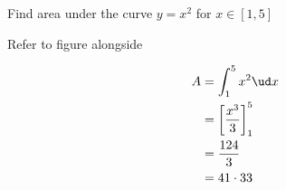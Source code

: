\question[4] Find area under the curve $y=x^2$ for $x\in [1,5]$

\ifprintanswers
  \begin{marginfigure}
  \end{marginfigure}
\fi

\begin{solution}[\halfpage]
  Refer to figure alongside

  \begin{align}
     A &= \int_1^5 x^2\ud x \\
	   &= \left[ \dfrac{x^3}{3}\right]_1^5 \\
	   &= \dfrac{124}{3} \\
	   &= 41\cdot 33
  \end{align} 
\end{solution}
